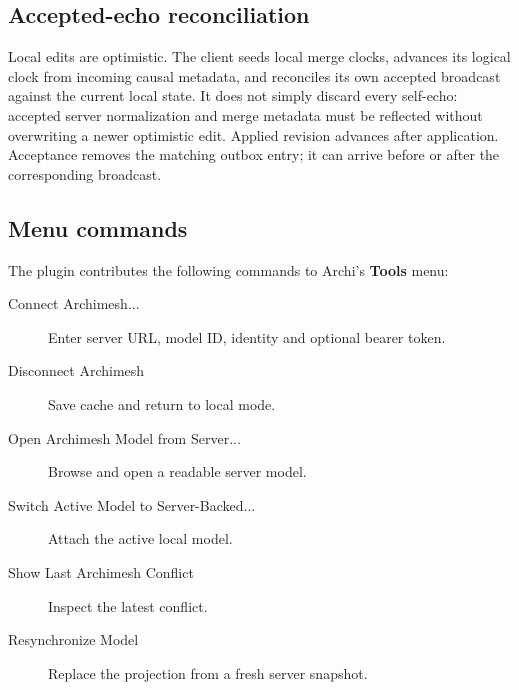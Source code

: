 \subsection{Accepted-echo reconciliation}

Local edits are optimistic. The client seeds local merge clocks, advances its
logical clock from incoming causal metadata, and reconciles its own accepted
broadcast against the current local state. It does not simply discard every
self-echo: accepted server normalization and merge metadata must be reflected
without overwriting a newer optimistic edit. Applied revision advances after
application. Acceptance removes the matching outbox entry; it can arrive
before or after the corresponding broadcast.

\subsection{Menu commands}

The plugin contributes the following commands to Archi's \textbf{Tools} menu:

\begingroup\small
\begin{description}
\item[Connect Archimesh...] Enter server URL, model ID, identity and optional bearer token.
\item[Disconnect Archimesh] Save cache and return to local mode.
\item[Open Archimesh Model from Server...] Browse and open a readable server model.
\item[Switch Active Model to Server-Backed...] Attach the active local model.
\item[Show Last Archimesh Conflict] Inspect the latest conflict.
\item[Resynchronize Model] Replace the projection from a fresh server snapshot.
\end{description}
\endgroup

